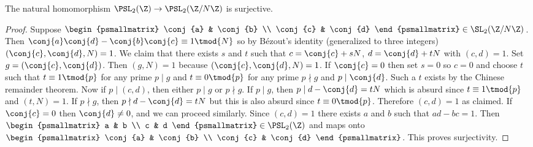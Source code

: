       \begin{proposition}\label{prop:surjective_modulo_N_for_modular_group}
        The natural homomorphism $\PSL_{2}(\Z) \to \PSL_{2}(\Z/N\Z)$ is surjective.
      \end{proposition}
      \begin{proof}
        Suppose $\begin{psmallmatrix} \conj{a} & \conj{b} \\ \conj{c} & \conj{d} \end{psmallmatrix} \in \SL_{2}(\Z/N\Z)$. Then $\conj{a}\conj{d}-\conj{b}\conj{c} \equiv 1 \tmod{N}$ so by B\'ezout's identity (generalized to three integers) $(\conj{c},\conj{d},N) = 1$. We claim that there exists $s$ and $t$ such that $c = \conj{c}+sN$, $d = \conj{d}+tN$ with $(c,d) = 1$. Set $g = (\conj{c},\conj{d})$. Then $(g,N) = 1$ because $(\conj{c},\conj{d},N) = 1$. If $\conj{c} = 0$ then set $s = 0$ so $c = 0$ and choose $t$ such that $t \equiv 1 \tmod{p}$ for any prime $p \mid g$ and $t \equiv 0 \tmod{p}$ for any prime $p \nmid g$ and $p \mid \conj{d}$. Such a $t$ exists by the Chinese remainder theorem. Now if $p \mid (c,d)$, then either $p \mid g$ or $p \nmid g$. If $p \mid g$, then $p \mid d-\conj{d} = tN$ which is absurd since $t \equiv 1 \tmod{p}$ and $(t,N) = 1$. If $p \nmid g$, then $p \nmid d-\conj{d} = tN$ but this is also absurd since $t \equiv 0 \tmod{p}$. Therefore $(c,d) = 1$ as claimed. If $\conj{c} = 0$ then $\conj{d} \neq 0$, and we can proceed similarly. Since $(c,d) = 1$ there exists $a$ and $b$ such that $ad-bc = 1$. Then $\begin{psmallmatrix} a & b \\ c & d \end{psmallmatrix} \in \PSL_{2}(\Z)$ and maps onto $\begin{psmallmatrix} \conj{a} & \conj{b} \\ \conj{c} & \conj{d} \end{psmallmatrix}$. This proves surjectivity.
      \end{proof}
      
